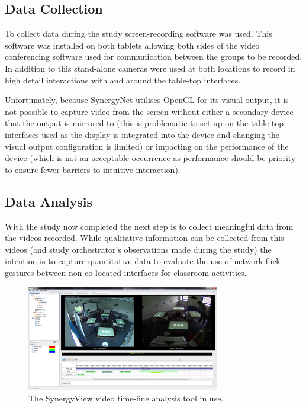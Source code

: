 \documentclass[a4paper,11pt]{article}
\begin{document}
 
\subsection{Data Collection}

To collect data during the study screen-recording software was used.
This software was installed on both tablets allowing both sides of the video conferencing software used for communication between the groups to be recorded.
In addition to this stand-alone cameras were used at both locations to record in high detail interactions with and around the table-top interfaces.

Unfortunately, because SynergyNet utilises OpenGL for its visual output, it is not possible to capture video from the screen without either a secondary device that the output is mirrored to (this is problematic to set-up on the table-top interfaces used as the display is integrated into the device and changing the visual output configuration is limited) or impacting on the performance of the device (which is not an acceptable occurrence as performance should be priority to ensure fewer barriers to intuitive interaction).

\subsection{Data Analysis}

With the study now completed the next step is to collect meaningful data from the videos recorded.
While qualitative information can be collected from this videos (and study orchestrator’s observations made during the study) the intention is to capture quantitative data to evaluate the use of network flick gestures between non-co-located interfaces for classroom activities.

\begin{figure}[h]
 \centering
   \includegraphics[width=0.75\textwidth]{figures/synergyviewexample.png}
   \caption{The SynergyView video time-line analysis tool in use.}
   \label{fig:SynergyviewExample}
\end{figure}
\end{document}
